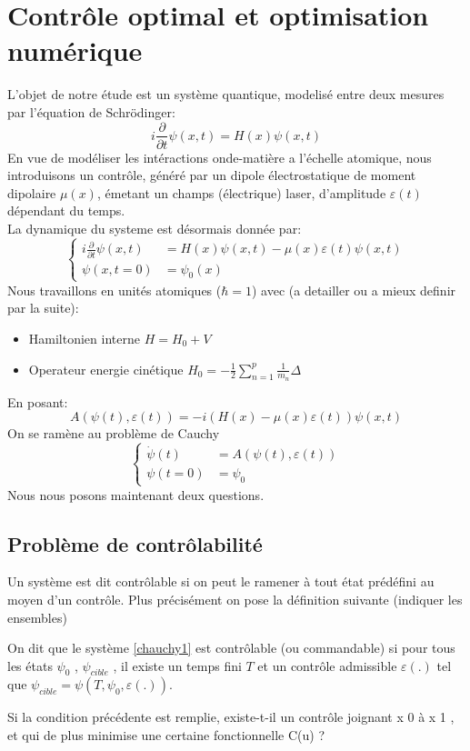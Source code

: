 \section*{Contrôle optimal et optimisation numérique}
L'objet de notre étude est un système quantique, modelisé entre deux mesures par l'équation de Schrödinger:
\begin{equation} \label{schrodinger}
i \frac{\partial }{\partial t} \psi (x,t) = H(x)\psi (x,t)
\end{equation}
En vue de modéliser les intéractions onde-matière a l'échelle atomique, nous introduisons un contrôle, généré par un dipole électrostatique de moment dipolaire $\mu (x)$, émetant un champs (électrique) laser, d'amplitude $\varepsilon (t)$ dépendant du temps.\\
La dynamique du systeme est désormais donnée par:
\begin{equation} \label{eq1}
\begin{cases}
i \frac{\partial }{\partial t} \psi (x,t) &= H(x)\psi (x,t)-\mu(x)\varepsilon(t)\psi (x,t) \\
\psi (x,t=0) &= \psi_0(x)
\end{cases}
\end{equation}
Nous travaillons en unités atomiques ($\hbar=1$) avec (a detailler ou a mieux definir par la suite):
\begin{itemize}
	\item Hamiltonien interne $H = H_0 + V$
	\item Operateur energie cinétique $H_0 = -\frac{1}{2} \sum_{n=1}^{p} \frac{1}{m_n} \varDelta$
\end{itemize}
En posant:
\begin{equation}
A(\psi(t),\varepsilon(t))= -i(H(x)-\mu(x)\varepsilon(t))\psi (x,t)
\end{equation}
On se ramène au problème de Cauchy
\begin{equation} \label{chauchy1}
\begin{cases}
\dot{\psi}(t) &= A(\psi(t),\varepsilon(t)) \\
\psi (t=0) &= \psi_0
\end{cases}
\end{equation}
Nous nous posons maintenant deux questions.
\subsection*{Problème de contrôlabilité}
Un système est dit contrôlable si on peut le ramener à tout état prédéfini au moyen d’un contrôle. Plus précisément on pose la définition suivante (indiquer les ensembles)
\begin{dfn}
On dit que le système \eqref{chauchy1} est contrôlable (ou commandable) si pour tous les états $\psi_0$ , $\psi_{cible}$ , il existe un temps fini $T$ et un contrôle admissible $\varepsilon(.)$ tel que $\psi_{cible} = \psi(T, \psi_0, \varepsilon(.))$.
\end{dfn}
Si la condition précédente est remplie, existe-t-il un contrôle joignant x 0 à x 1 , et qui de plus
minimise une certaine fonctionnelle C(u) ?
